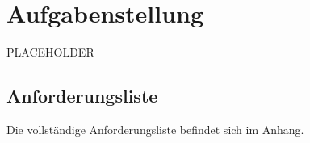 \section{Aufgabenstellung}

PLACEHOLDER

\subsection{Anforderungsliste}

Die vollständige Anforderungsliste befindet sich im Anhang.